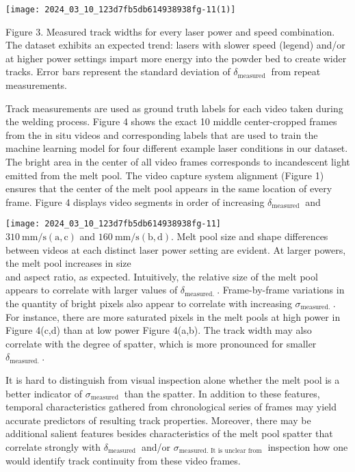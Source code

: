 \documentclass[10pt]{article}
\begin{document}
\begin{center}
\texttt{[image: 2024\_03\_10\_123d7fb5db614938938fg-11(1)]}
\end{center}

Figure 3. Measured track widths for every laser power and speed combination. The dataset exhibits an expected trend: lasers with slower speed (legend) and/or at higher power settings impart more energy into the powder bed to create wider tracks. Error bars represent the standard deviation of $\delta_{\text {measured }}$ from repeat measurements.

Track measurements are used as ground truth labels for each video taken during the welding process. Figure 4 shows the exact 10 middle center-cropped frames from the in situ videos and corresponding labels that are used to train the machine learning model for four different example laser conditions in our dataset. The bright area in the center of all video frames corresponds to incandescent light emitted from the melt pool. The video capture system alignment (Figure 1) ensures that the center of the melt pool appears in the same location of every frame. Figure 4 displays video segments in order of increasing $\delta_{\text {measured }}$ and

\texttt{[image: 2024\_03\_10\_123d7fb5db614938938fg-11]}\\
$310 \mathrm{~mm} / \mathrm{s}(\mathrm{a}, \mathrm{c})$ and $160 \mathrm{~mm} / \mathrm{s}(\mathrm{b}, \mathrm{d})$. Melt pool size and shape differences between videos at each distinct laser power setting are evident. At larger powers, the melt pool increases in size\\
and aspect ratio, as expected. Intuitively, the relative size of the melt pool appears to correlate with larger values of $\delta_{\text {measured. }}$. Frame-by-frame variations in the quantity of bright pixels also appear to correlate with increasing $\sigma_{\text {measured. }}$. For instance, there are more saturated pixels in the melt pools at high power in Figure 4(c,d) than at low power Figure 4(a,b). The track width may also correlate with the degree of spatter, which is more pronounced for smaller $\delta_{\text {measured. }}$.

It is hard to distinguish from visual inspection alone whether the melt pool is a better indicator of $\sigma_{\text {measured }}$ than the spatter. In addition to these features, temporal characteristics gathered from chronological series of frames may yield accurate predictors of resulting track properties. Moreover, there may be additional salient features besides characteristics of the melt pool spatter that correlate strongly with $\delta_{\text {measured }}$ and/or $\sigma_{\text {measured. It is unclear from }}$ inspection how one would identify track continuity from these video frames.
\end{document}
